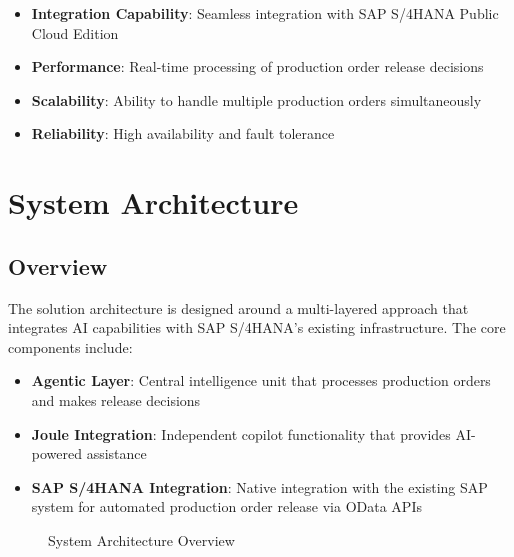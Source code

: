 \begin{itemize}
    \item \textbf{Integration Capability}: Seamless integration with SAP S/4HANA Public Cloud Edition
    \item \textbf{Performance}: Real-time processing of production order release decisions
    \item \textbf{Scalability}: Ability to handle multiple production orders simultaneously
    \item \textbf{Reliability}: High availability and fault tolerance
\end{itemize}

\section{System Architecture}

\subsection{Overview}

The solution architecture is designed around a multi-layered approach that integrates AI capabilities with SAP S/4HANA's existing infrastructure. The core components include:

\begin{itemize}
    \item \textbf{Agentic Layer}: Central intelligence unit that processes production orders and makes release decisions
    \item \textbf{Joule Integration}: Independent copilot functionality that provides AI-powered assistance
    \item \textbf{SAP S/4HANA Integration}: Native integration with the existing SAP system for automated production order release via OData APIs
\end{itemize}

\begin{figure}[h]
    \centering
    \caption{System Architecture Overview}
    \label{fig:system-architecture}
\end{figure}
